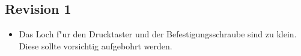 \subsection{Revision 1}
\begin{itemize}
\item Das Loch f"ur den Drucktaster und der Befestigungsschraube sind zu klein. Diese sollte vorsichtig aufgebohrt werden. 
\end{itemize}

